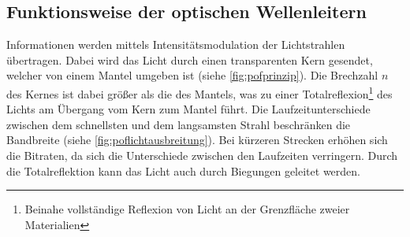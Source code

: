 \subsection{Funktionsweise der optischen Wellenleitern}
\label{subsec:poffunktionsweise}

Informationen werden mittels Intensitätsmodulation der Lichtstrahlen übertragen.
Dabei wird das Licht durch einen transparenten Kern gesendet, welcher von einem
Mantel umgeben ist (siehe \autoref{fig:pofprinzip}). Die Brechzahl $n$ des
Kernes ist dabei größer als die des Mantels, was zu einer
Totalreflexion\footnote{Beinahe vollständige Reflexion von Licht an der
Grenzfläche zweier Materialien} des Lichts am Übergang vom Kern zum Mantel
führt. Die Laufzeitunterschiede zwischen dem schnellsten und dem langsamsten
Strahl beschränken die Bandbreite (siehe \autoref{fig:poflichtausbreitung}). Bei
kürzeren Strecken erhöhen sich die Bitraten, da sich die Unterschiede zwischen
den Laufzeiten verringern. Durch die Totalreflektion kann das Licht auch durch
Biegungen geleitet werden. \cite{pofacprinzip}

